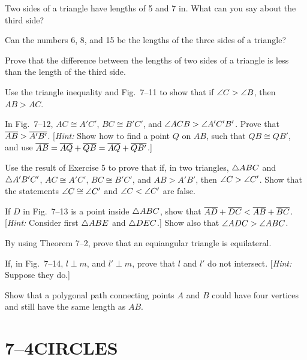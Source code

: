 \documentclass[11pt]{book}
\begin{document}
\begin{exercisecols}
\begin{exlist}
\item Two sides of a triangle have lengths of 5 and 7 in. What can you say
  about the third side?
\item Can the numbers 6, 8, and 15 be the lengths of the three sides of a
  triangle?
\item Prove that the difference between the lengths of two sides of a triangle
  is less than the length of the third side.
\item[\stex 4.] Use the triangle inequality and Fig.~7--11 to show that if
  $\angle C > \angle B$, then $AB > AC$.
\exfig{\FIGVIIELEVEN}
\item[\stex 5.] In Fig.~7--12, $AC \cong A'C'$, $BC \cong B'C'$, and
  $\angle ACB > \angle A'C'B'$. Prove that $\overline{AB} > \overline{A'B'}$.
  [\emph{Hint:} Show how to find a point $Q$ on $AB$, such that
  $QB \cong QB'$, and use $\overline{AB} = \overline{AQ} + \overline{QB} = \overline{AQ} + \overline{QB'}$.]
\exfig{\FIGVIITWELVE}
\item[\stex 6.] Use the result of Exercise 5 to prove that if, in two
  triangles, $\triangle ABC$ and $\triangle A'B'C'$, $AC \cong A'C'$,
  $BC \cong B'C'$, and $AB > A'B'$, then $\angle C > \angle C'$. Show that the
  statements $\angle C \cong \angle C'$ and $\angle C < \angle C'$ are false.
\item[\stex 7.] If $D$ in Fig.~7--13 is a point inside $\triangle ABC$, show that
  $\overline{AD} + \overline{DC} < \overline{AB} + \overline{BC}$. [\emph{Hint:} Consider first
  $\triangle ABE$ and $\triangle DEC$.] Show also that $\angle ADC > \angle ABC$.
\exfig{\FIGVIITHIRTEEN}
\item By using Theorem 7--2, prove that an equiangular triangle is equilateral.
\item If, in Fig.~7--14, $l \perp m$, and $l' \perp m$, prove that $l$ and $l'$
  do not intersect. [\emph{Hint:} Suppose they do.]
\exfig{\FIGVIIFOURTEEN}
\item Show that a polygonal path connecting points $A$ and $B$ could have four
  vertices and still have the same length as $AB$.
\end{exlist}
\end{exercisecols}

\section*{7--4\quad CIRCLES}
\end{document}
